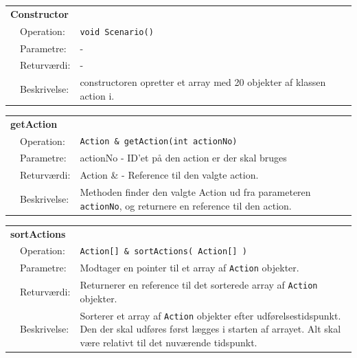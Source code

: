 \begin{table}[h]
\begin{tabularx}{\textwidth}{p{0.6 cm} l X} %
\multicolumn{3}{l}{\textbf{Constructor}}\\
& Operation: & 
\texttt{void Scenario()}  
\\ & Parametre: & 
-
\\ & Returværdi: & 
-
\\ & Beskrivelse: & 
constructoren opretter et array med 20 objekter af klassen action i.
\\ \end{tabularx}
\end{table}

\begin{table}[h]
\begin{tabularx}{\textwidth}{p{0.6 cm} l X} %
\multicolumn{3}{l}{\textbf{getAction}}\\
& Operation: & 
\texttt{Action \& getAction(int actionNo)}  
\\ & Parametre: & 
actionNo - ID'et på den action er der skal bruges
\\ & Returværdi: & 
Action \& - Reference til den valgte action.
\\ & Beskrivelse: & 
Methoden finder den valgte Action ud fra parameteren \texttt{actionNo}, og returnere en reference til den action.
\\ \end{tabularx}
\end{table}

\begin{table}[h]
\begin{tabularx}{\textwidth}{p{0.6 cm} l X} %
\multicolumn{3}{l}{\textbf{sortActions}}\\
& Operation: & 
\texttt{Action[] \& sortActions( Action[] )}  
\\ & Parametre: & 
Modtager en pointer til et array af \texttt{Action} objekter.
\\ & Returværdi: & 
Returnerer en reference til det sorterede array af \texttt{Action} objekter.
\\ & Beskrivelse: & 
Sorterer et array af \texttt{Action} objekter efter udførelsestidspunkt. Den der skal udføres først lægges i starten af arrayet. Alt skal være relativt til det nuværende tidspunkt.
\\ \end{tabularx}
\end{table}

